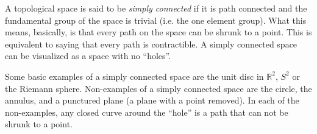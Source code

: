 \documentclass[12pt]{article}
\begin{document}
A topological space is said to be \emph{simply connected} if it is path connected and the fundamental group of the space is trivial (i.e. the one element group).  What this means, basically, is that every path on the space can be shrunk to a point.  This is equivalent to saying that every path is contractible.  A simply connected space can be visualized as a space with no ``holes''.

Some basic examples of a simply connected space are the unit disc in $\mathbb{R}^2$, $S^2$ or the Riemann sphere.  Non-examples of a simply connected space are the circle, the annulus, and a punctured plane (a plane with a point removed).  In each of the non-examples, any closed curve around the ``hole'' is a path that can not be shrunk to a point.
\end{document}
